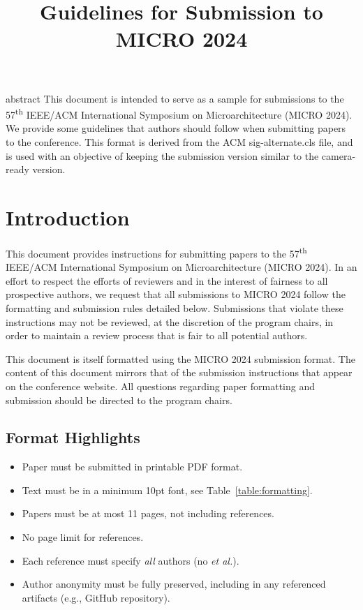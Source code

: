\documentclass{common/sig-alternate}
\title{Guidelines for Submission to MICRO 2024}
\begin{document}
\maketitle
\thispagestyle{firstpage}
\pagestyle{plain}




\begin{countenv}{abstract}
  This document is intended to serve as a sample for submissions to the 57\textsuperscript{th} IEEE/ACM International Symposium on Microarchitecture\textsuperscript{\textregistered} (MICRO 2024). We provide some guidelines that authors should follow when submitting papers to the conference.  This format is derived from the ACM sig-alternate.cls file, and is used with an objective of keeping the submission version similar to the camera-ready version.
\end{countenv}


\section{Introduction}

This document provides instructions for submitting papers to the 57\textsuperscript{th} IEEE/ACM International Symposium on Microarchitecture\textsuperscript{\textregistered} (MICRO 2024).  In an effort to respect the efforts of reviewers and in the interest of fairness to all prospective authors, we request that all submissions to MICRO 2024 follow the formatting and submission rules detailed below. Submissions that violate these instructions may not be reviewed, at the discretion of the program chairs, in order to maintain a review process that is fair to all potential authors. 

This document is itself formatted using the MICRO 2024 submission format. The content of this document mirrors that of the submission instructions that appear on the conference website. All questions regarding paper formatting and submission should be directed to the program chairs.

\subsection{Format Highlights}
\begin{itemize}
\item Paper must be submitted in printable PDF format.
\item Text must be in a minimum 10pt font, see Table~\ref{table:formatting}.
\item Papers must be at most 11 pages, not including references.
\item No page limit for references.
\item Each reference must specify {\em all} authors (no {\em et al.}).
\item Author anonymity must be fully preserved, including in any referenced artifacts (e.g., GitHub repository).
\end{itemize}
\end{document}
